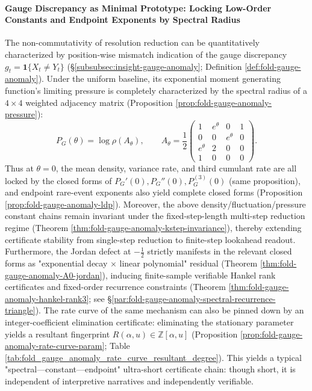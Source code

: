 \paragraph{Gauge Discrepancy as Minimal Prototype: Locking Low-Order Constants and Endpoint Exponents by Spectral Radius}
The non-commutativity of resolution reduction can be quantitatively characterized by position-wise mismatch indication of the gauge discrepancy \(g_t=\mathbf 1\{X_t\neq Y_t\}\) (\S\ref{subsubsec:insight-gauge-anomaly}; Definition \ref{def:fold-gauge-anomaly}).
Under the uniform baseline, its exponential moment generating function's limiting pressure is completely characterized by the spectral radius of a \(4\times 4\) weighted adjacency matrix (Proposition \ref{prop:fold-gauge-anomaly-pressure}):
\[
P_G(\theta)=\log\rho(A_\theta),\qquad
A_\theta=\frac12\begin{pmatrix}
1 & e^\theta & 0 & 1\\
0 & 0 & e^\theta & 0\\
e^\theta & 2 & 0 & 0\\
1 & 0 & 0 & 0
\end{pmatrix}.
\]
Thus at \(\theta=0\), the mean density, variance rate, and third cumulant rate are all locked by the closed forms of \(P_G'(0),P_G''(0),P_G^{(3)}(0)\) (same proposition), and endpoint rare-event exponents also yield complete closed forms (Proposition \ref{prop:fold-gauge-anomaly-ldp}).
Moreover, the above density/fluctuation/pressure constant chains remain invariant under the fixed-step-length multi-step reduction regime (Theorem \ref{thm:fold-gauge-anomaly-kstep-invariance}), thereby extending certificate stability from single-step reduction to finite-step lookahead readout.
Furthermore, the Jordan defect at \(-\tfrac12\) strictly manifests in the relevant closed forms as "exponential decay \(\times\) linear polynomial" residual (Theorem \ref{thm:fold-gauge-anomaly-A0-jordan}), inducing finite-sample verifiable Hankel rank certificates and fixed-order recurrence constraints (Theorem \ref{thm:fold-gauge-anomaly-hankel-rank3}; see \S\ref{par:fold-gauge-anomaly-spectral-recurrence-triangle}).
The rate curve of the same mechanism can also be pinned down by an integer-coefficient elimination certificate: eliminating the stationary parameter yields a resultant fingerprint \(R(\alpha,u)\in\mathbb Z[\alpha,u]\) (Proposition \ref{prop:fold-gauge-anomaly-rate-curve-param}; Table \ref{tab:fold_gauge_anomaly_rate_curve_resultant_degree}).
This yields a typical "spectral—constant—endpoint" ultra-short certificate chain: though short, it is independent of interpretive narratives and independently verifiable.

